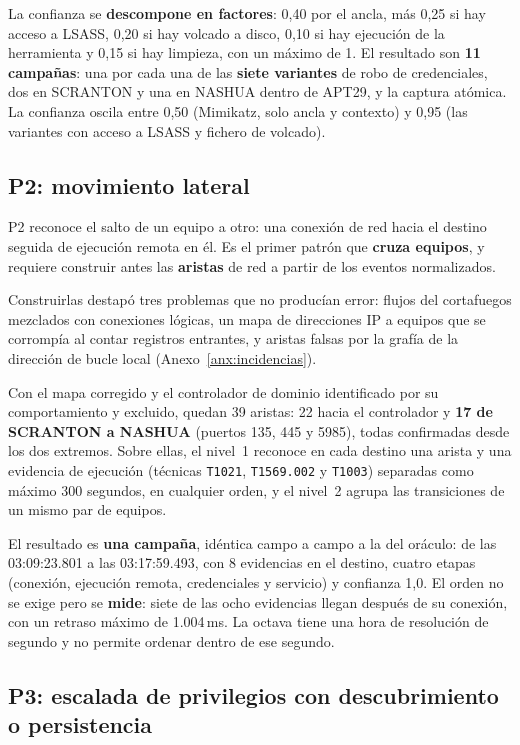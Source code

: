 La confianza se \textbf{descompone en factores}: 0,40 por el ancla, más 0,25 si hay acceso a
LSASS, 0,20 si hay volcado a disco, 0,10 si hay ejecución de la herramienta y 0,15 si hay
limpieza, con un máximo de 1. El resultado son \textbf{11 campañas}: una por cada una de
las \textbf{siete variantes} de robo de credenciales, dos en SCRANTON y una en NASHUA dentro
de APT29, y la captura atómica. La confianza oscila entre 0,50 (Mimikatz, solo ancla y
contexto) y 0,95 (las variantes con acceso a LSASS y fichero de volcado).

\subsection{P2: movimiento lateral}

P2 reconoce el salto de un equipo a otro: una conexión de red hacia el destino seguida de
ejecución remota en él. Es el primer patrón que \textbf{cruza equipos}, y requiere
construir antes las \textbf{aristas} de red a partir de los eventos normalizados.

Construirlas destapó tres problemas que no producían error: flujos del cortafuegos mezclados con
conexiones lógicas, un mapa de direcciones IP a equipos que se corrompía al contar registros
entrantes, y aristas falsas por la grafía de la dirección de bucle local
(Anexo~\ref{anx:incidencias}).

Con el mapa corregido y el controlador de dominio identificado por su comportamiento y
excluido, quedan 39 aristas: 22 hacia el controlador y \textbf{17 de SCRANTON a NASHUA}
(puertos 135, 445 y 5985), todas confirmadas desde los dos extremos. Sobre ellas, el nivel~1
reconoce en cada destino una arista y una evidencia de ejecución (técnicas \texttt{T1021},
\texttt{T1569.002} y \texttt{T1003}) separadas como máximo 300 segundos, en cualquier orden,
y el nivel~2 agrupa las transiciones de un mismo par de equipos.

El resultado es \textbf{una campaña}, idéntica campo a campo a la del oráculo: de las
03:09:23.801 a las 03:17:59.493, con 8 evidencias en el destino, cuatro etapas (conexión,
ejecución remota, credenciales y servicio) y confianza 1,0. El orden no se exige pero se
\textbf{mide}: siete de las ocho evidencias llegan después de su conexión, con un retraso
máximo de 1.004\,ms. La octava tiene una hora de resolución de segundo y no permite ordenar
dentro de ese segundo.

\subsection{P3: escalada de privilegios con descubrimiento o persistencia}

